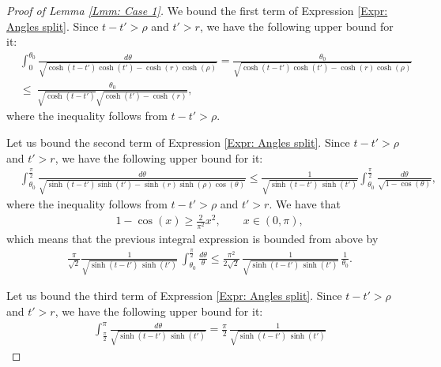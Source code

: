 \documentclass[11pt,twoside,reqno]{amsart} \usepackage{a4wide} \usepackage[T1]{fontenc} \usepackage[utf8]{inputenc} \usepackage{soul}  \usepackage{amsmath} \usepackage{amsfonts} \usepackage{amssymb} \usepackage{mathtools} \usepackage{amsthm} \usepackage{xcolor} \usepackage{graphicx} \usepackage{hyperref} \usepackage{standalone} \usepackage{esint} \usepackage{comment} \usepackage[left=2.3cm,top=3cm,right=2.3cm]{geometry} \usepackage{bm} \usepackage{svg} \usepackage{float} \numberwithin{equation}{section} \theoremstyle{plain} \newtheorem{thm}{Theorem}[section] \newtheorem{theorem}[thm]{Theorem} \newtheorem*{theorem*}{Theorem}\newtheorem{conj}[thm]{Conjecture} \newtheorem{lemma}[thm]{Lemma} \newtheorem{prop}[thm]{Proposition} \newtheorem{proposition}[thm]{Proposition} \newtheorem{cor}[thm]{Corollary} \newtheorem{question}[thm]{Question} \newtheorem{corollary}[thm]{Corollary} \newtheorem{assumption}[thm]{Assumption} \theoremstyle{definition} \newtheorem{defn}[thm]{Definition} \newtheorem{choice}[thm]{Choice} \newtheorem{definition}[thm]{Definition} \newtheorem{ex}[thm]{Example} \newtheorem{notation}[thm]{Notation} \newtheorem*{ack}{Acknowledgements} \theoremstyle{remark} \newtheorem{remark}[thm]{Remark} \newtheorem{bigremark}[thm]{Remark} \usepackage{xcolor} \newcommand{\red}[1]{ {\color{Red}#1} } \newcommand{\blue}[1]{ {\color{Blue}#1} } \author{Kai Hippi} \address{Aalto University, Espoo, Finland} \email{kai.hippi@aalto.fi}
\begin{document}
\begin{proof}[Proof of Lemma \ref{Lmm: Case 1}]
	We bound the first term of Expression \eqref{Expr: Angles split}. Since $ t - t' > \rho $ and $ t' > r $, we have the following upper bound for it:
	\begin{align*}
		&
		\int_{0}^{\theta_{0}}  \frac{d \theta}{ \sqrt{  \cosh( t-t' ) \cosh( t' ) - \cosh( r ) \cosh( \rho ) } } = \frac{ \theta_{0} }{ \sqrt{  \cosh( t-t' ) \cosh( t' ) - \cosh( r ) \cosh( \rho ) } }
		\\
		& \leq  \ 
		\frac{ \theta_{0} }{ \sqrt{ \cosh( t - t' ) } \sqrt{ \cosh( t' ) - \cosh( r ) } },
	\end{align*}
	where the inequality follows from $ t - t' > \rho $. 

	Let us bound the second term of Expression \eqref{Expr: Angles split}. Since $ t - t' >\rho $ and $ t' > r $, we have the following upper bound for it:
	\begin{align*}
		&
		\int_{\theta_{0}}^{ \frac{\pi}{2} } \frac{ d\theta }{ \sqrt{ \sinh( t-t' ) \sinh( t' ) - \sinh( r ) \sinh( \rho ) \cos( \theta ) } } \leq  \frac{1}{\sqrt{ \sinh( t - t' ) \, \sinh( t' ) }} \int_{\theta_{0}}^{ \frac{\pi}{2} } \frac{ d\theta }{ \sqrt{ 1 -   \cos( \theta ) } },
	\end{align*}
	where the inequality follows from $ t-t' > \rho $ and $ t' > r $. We have that
	\begin{align*}
		&
		1 - \cos( x ) \geq \frac{2}{\pi^{2}} x^{2}, \qquad x \in ( 0, \pi ),
	\end{align*}
	which means that the previous integral expression is bounded from above by
	\begin{align*}
		&
		\frac{\pi}{\sqrt{2}} \frac{1}{\sqrt{ \sinh( t-t' ) \, \sinh( t' ) }} \, \int_{\theta_{0}}^{ \frac{\pi}{2} } \frac{d\theta}{ \theta} \leq \frac{\pi^{2}}{2 \sqrt{2}} \, \frac{1}{\sqrt{ \sinh( t-t' ) \, \sinh( t' ) }} \, \frac{1}{\theta_{0}}.
	\end{align*}

	Let us bound the third term of Expression \eqref{Expr: Angles split}. Since $ t-t' > \rho $ and $ t' > r $, we have the following upper bound for it:
	\begin{align*}
		&
		\int_{ \frac{\pi}{2} }^{\pi} \frac{d \theta}{\sqrt{ \sinh( t - t' ) \, \sinh( t' ) }} = \frac{\pi}{ 2 } \, \frac{1}{\sqrt{ \sinh( t-t' ) \, \sinh( t' ) }}
	\end{align*}
	


\end{proof}
\end{document}
